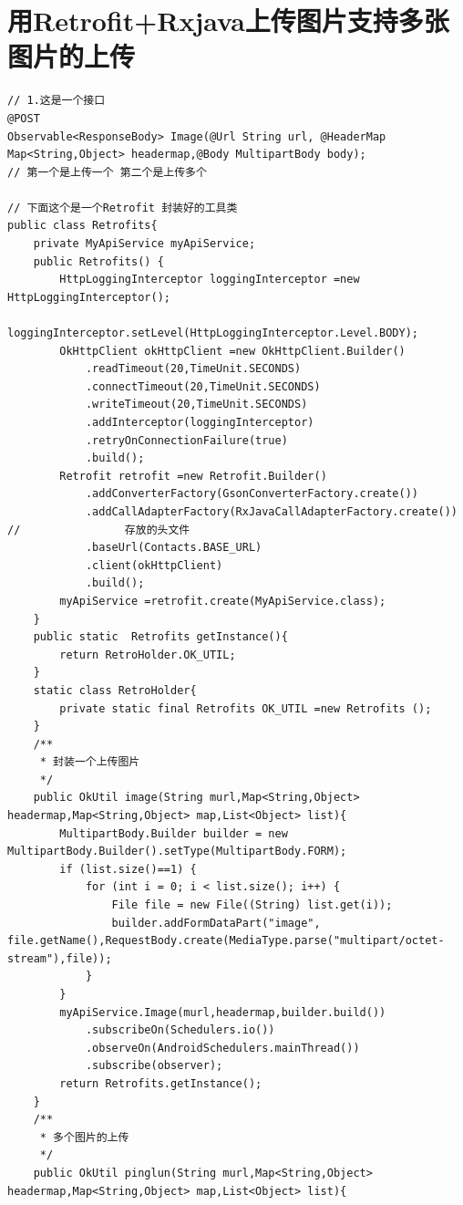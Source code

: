 \documentclass[9pt, b5paper]{article}
\begin{document}
\section{用Retrofit+Rxjava上传图片支持多张图片的上传}
\label{sec-10}
\begin{verbatim}
// 1.这是一个接口
@POST
Observable<ResponseBody> Image(@Url String url, @HeaderMap Map<String,Object> headermap,@Body MultipartBody body);
// 第一个是上传一个 第二个是上传多个

// 下面这个是一个Retrofit 封装好的工具类
public class Retrofits{
    private MyApiService myApiService;
    public Retrofits() {
        HttpLoggingInterceptor loggingInterceptor =new HttpLoggingInterceptor();
        loggingInterceptor.setLevel(HttpLoggingInterceptor.Level.BODY);
        OkHttpClient okHttpClient =new OkHttpClient.Builder()
            .readTimeout(20,TimeUnit.SECONDS)
            .connectTimeout(20,TimeUnit.SECONDS)
            .writeTimeout(20,TimeUnit.SECONDS)
            .addInterceptor(loggingInterceptor)
            .retryOnConnectionFailure(true)
            .build();
        Retrofit retrofit =new Retrofit.Builder()
            .addConverterFactory(GsonConverterFactory.create())
            .addCallAdapterFactory(RxJavaCallAdapterFactory.create())
//                存放的头文件
            .baseUrl(Contacts.BASE_URL)
            .client(okHttpClient)
            .build();
        myApiService =retrofit.create(MyApiService.class);
    }
    public static  Retrofits getInstance(){
        return RetroHolder.OK_UTIL;
    }
    static class RetroHolder{
        private static final Retrofits OK_UTIL =new Retrofits ();
    }
    /**
     * 封装一个上传图片
     */
    public OkUtil image(String murl,Map<String,Object> headermap,Map<String,Object> map,List<Object> list){
        MultipartBody.Builder builder = new MultipartBody.Builder().setType(MultipartBody.FORM);
        if (list.size()==1) {
            for (int i = 0; i < list.size(); i++) {
                File file = new File((String) list.get(i));
                builder.addFormDataPart("image", file.getName(),RequestBody.create(MediaType.parse("multipart/octet-stream"),file));
            }
        }
        myApiService.Image(murl,headermap,builder.build())
            .subscribeOn(Schedulers.io())
            .observeOn(AndroidSchedulers.mainThread())
            .subscribe(observer);
        return Retrofits.getInstance();
    }
    /**
     * 多个图片的上传
     */
    public OkUtil pinglun(String murl,Map<String,Object> headermap,Map<String,Object> map,List<Object> list){

\end{verbatim}
\end{document}
